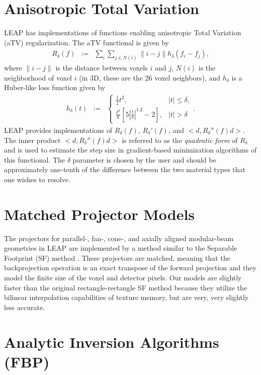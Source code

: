 \documentclass[11pt]{article}
\begin{document}
\section{Anisotropic Total Variation}

LEAP has implementations of functions enabling anisotropic Total Variation (aTV) regularization.  The aTV functional is given by
\begin{eqnarray*}
R_\delta(f) &:=& \sum_i \sum_{j \in N(i)} \|i-j\| h_\delta(f_i-f_j),
\end{eqnarray*}
where $\|i-j\|$ is the distance between voxels $i$ and $j$, $N(i)$ is the neighborhood of voxel $i$ (in 3D, these are the 26 voxel neighbors), and $h_\delta$ is a Huber-like loss function given by
\begin{eqnarray*}
h_\delta(t) &:=& \begin{cases} \frac{1}{2}t^2, & |t| \leq \delta, \\ \frac{\delta^2}{6}\left[5\left|\frac{t}{\delta}\right|^{1.2}-2\right], & |t| > \delta \end{cases}.
\end{eqnarray*}
LEAP provides implementations of $R_\delta(f)$, $R_{\delta}'(f)$, and $<d, R_{\delta}''(f)d>$.  The inner product $<d, R_{\delta}''(f)d>$ is referred to as the \textit{quadratic form} of $R_\delta$ and is used to estimate the step size in gradient-based minimization algorithms of this functional.  The $\delta$ parameter is chosen by the user and should be approximately one-tenth of the difference between the two material types that one wishes to resolve.

\section{Matched Projector Models}

The projectors for parallel-, fan-, cone-, and axially aligned modular-beam geometries in LEAP are implemented by a method similar to the Separable Footprint (SF) method \cite{Long_TMI_2010}.  These projectors are matched, meaning that the backprojection operation is an exact transpose of the forward projection and they model the finite size of the voxel and detector pixels.  Our models are slightly faster than the original rectangle-rectangle SF method because they utilize the bilinear interpolation capabilities of texture memory, but are very, very slightly less accurate.

\section{Analytic Inversion Algorithms (FBP)} \label{sec:FBP}
\end{document}
